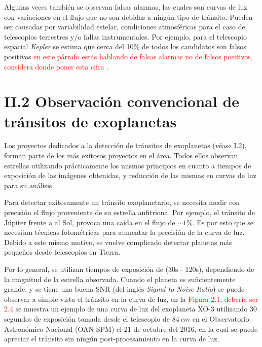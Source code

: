 Algunas veces también se observan falsas alarmas, las cuales son curvas de luz con variaciones en el flujo que no son debidas a ningún tipo de tránsito. Pueden ser causadas por variabilidad estelar, condiciones atmosféricas para el caso de telescopios terrestres y/o fallas instrumentales. Por ejemplo, para el telescopio espacial \textit{Kepler} se estima que cerca del 10\% de todos los candidatos son falsos positivos \textcolor{red}{en este párrafo estás hablando de falsas alarmas no de falsos positivos, considera donde poner esta cifra} \citep{fressin2013false}.


\section*{II.2 Observación convencional de tránsitos de exoplanetas}

Los proyectos dedicados a la detección de tránsitos de exoplanetas (véase I.2), forman parte de los más exitosos proyectos en el área. Todos ellos observan estrellas utilizando prácticamente los mismos principios en cuanto a tiempos de exposición de las imágenes obtenidas, y reducción de las mismas en curvas de luz para su análisis.

Para detectar exitosamente un tránsito exoplanetario, se necesita medir con precisión el flujo proveniente de su estrella anfitriona. Por ejemplo, el tránsito de Júpiter frente a al Sol, provoca una caída en el flujo de $\sim 1\%$. Es por esto que se necesitan técnicas fotométricas para aumentar la precisión de la curva de luz. Debido a este mismo motivo, se vuelve complicado detectar planetas más pequeños desde telescopios en Tierra.

Por lo general, se utilizan tiempos de exposición de (30s - 120s), dependiendo de la magnitud de la estrella observada. Cuando el planeta es suficientemente grande, y se tiene una buena SNR (del inglés \textit{Signal to Noise Ratio}) se puede observar a simple vista el tránsito en la curva de luz, en la \textcolor{red}{Figura 2.1, debería ser 2.4} se muestra un ejemplo de una curva de luz del exoplaneta XO-3 \citep{johns2008xo} utilizando 30 segundos de exposición tomada desde el telescopio de $84~cm$ en el Observatorio Astronómico Nacional (OAN-SPM) el 21 de octubre del 2016, en la cual se puede apreciar el tránsito sin ningún post-procesamiento en la curva de luz.

